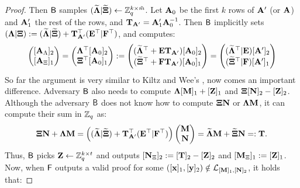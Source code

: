 \begin{proof}
Then $\mathsf{B}$ samples $(\widetilde{\mathbf{{\Lambda}}}|\widetilde{\mathbf{{\Xi}}}) \gets \mathbb{Z}_q^{k \times \tilde{m}}$.  Let $\mathbf{{A}}_0$ be the first $k$ rows of $\mathbf{{A}}'$ (or $\mathbf{{A}}$) and $\mathbf{{A}}_1'$ the rest of the rows, and $\mathbf{{T}}_{\mathbf{{A}}'}=\mathbf{{A}}'_1 \mathbf{{A}}_0^{-1}$. Then $\mathsf{B}$ implicitly sets 
$(\mathbf{{\Lambda}} | \mathbf{{\Xi}}):= (\widetilde{\mathbf{{\Lambda}}} | \widetilde{\mathbf{{\Xi}}})+ \mathbf{{T}}^{\top}_{\mathbf{{A}}'} (\mathbf{{E}}^{\top} | \mathbf{{F}}^{\top})$, and computes:
\begin{equation}
\begin{pmatrix}
[\matrA_{\Lambda}]_2\\
[\matrA_{\Xi}]_1
\end{pmatrix}=
\begin{pmatrix}
\matr{\Lambda}^{\top} [\matrA_0]_2\\
\matr{\Xi}^{\top} [\matrA_0]_1
\end{pmatrix}:=
\begin{pmatrix}
(\widetilde{\matr{\Lambda}}^{\top}+ \matr{E} \matr{T}_{\matrA'}) [\matrA_0]_2 \\
(\widetilde{\matr{\Xi}}^{\top}+ \matr{F} \matr{T}_{\matrA'}) [\matrA_0]_1
\end{pmatrix}
=
\begin{pmatrix}
(\widetilde{\matr{\Lambda}}^{\top}\cat \matr{E}) [\matrA']_2 \\
(\widetilde{\matr{\Xi}}^{\top}\cat \matr{F} ) [\matrA']_1
\end{pmatrix}
\end{equation}
So far the argument is very similar to Kiltz and Wee's \cite[Section~3.2]{EC:KilWee15}, now comes an important difference. 
Adversary $\mathsf{B}$ also needs to compute $\mathbf{{\Lambda}}[\mathbf{{M}}]_1+[\mathbf{{Z}}]_1$ and 
$\mathbf{{\Xi}}[\mathbf{{N}}]_2-[\mathbf{{Z}}]_2$. Although the adversary $\mathsf{B}$ does not know how to 
compute $\mathbf{{\Xi}}\mathbf{{N}}$ or $\mathbf{{\Lambda}}\mathbf{{M}}$, it can compute their sum in $\mathbb{Z}_q$ as:
 $$\mathbf{{\Xi}}\mathbf{{N}}+\mathbf{{\Lambda}}\mathbf{{M}}=
    \left(
        (\widetilde{\mathbf{{\Lambda}}} | \widetilde{\mathbf{{\Xi}}})
        + \mathbf{{T}}^{\top}_{\mathbf{{A}}'}(\mathbf{{E}}^{\top}|\mathbf{{F}}^{\top})
    \right)
 \begin{pmatrix}
    \mathbf{{M}} \\ \mathbf{{N}}
 \end{pmatrix} =\widetilde{\mathbf{{\Lambda}}} \mathbf{{M}}+\widetilde{\mathbf{{\Xi}}} \mathbf{{N}}=:\mathbf{{T}}.  
 $$
Thus, $\mathsf{B}$ picks $\mathbf{{Z}} \gets \mathbb{Z}_q^{k \times t}$ and outputs 
$[\mathbf{{N}}_{\Xi}]_2:=[\mathbf{{T}}]_2-[\mathbf{{Z}}]_2$ and  $[\mathbf{{M}}_{\Xi}]_1:=[\mathbf{{Z}}]_1$.
Now, when $\mathsf{F}$ outputs a valid proof for some $([\mathbf{x}]_1,[\mathbf{y}]_2) \notin \mathcal{L}_{[\mathbf{{M}}]_1,[\mathbf{{N}}]_2}$, it holds that:

\end{proof}
